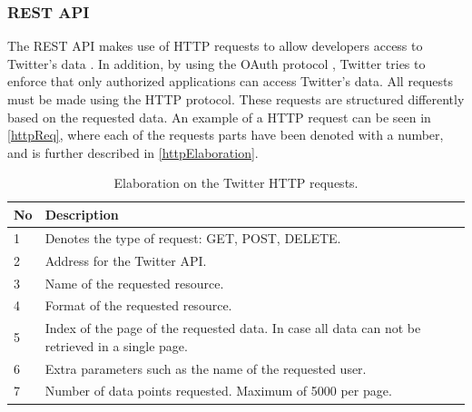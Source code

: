 \subsubsection{REST API}
The \ac{REST} \ac{API} makes use of \ac{HTTP} requests to allow developers
access to Twitter's data \citep{TwitterREST}. In addition, by using the OAuth protocol
\citep{TwitterOAuth}, Twitter tries to enforce that only authorized applications
can access Twitter's data. All requests must be made using the
\ac{HTTP} protocol. These requests are structured differently based on the
requested data. An example of a \ac{HTTP} request can be seen in
\autoref{httpReq}, where each of the requests parts have been denoted with a
number, and is further described in \autoref{httpElaboration}.


\begin{table}[H] 
\begin{centering}
\begin{tabular}{|l|p{9cm}|l|}
\hline
\textbf{No}&	\textbf{Description}										\\\hline
1			&	Denotes the type of request: GET, POST, DELETE.				\\\hline
2			&	Address for the Twitter \ac{API}.							\\\hline
3			&	Name of the requested resource.	   							\\\hline
4			&	Format of the requested resource.							\\\hline
5			&	Index of the page of the requested data. In case all data can not be
retrieved in a single page.													\\\hline 
6			&	Extra parameters such as the name of the requested user.	\\\hline
7			&	Number of data points requested. Maximum of 5000 per page.	\\\hline
\end{tabular}
\caption{Elaboration on the Twitter HTTP requests.}
\label{httpElaboration}
\end{centering}
\end{table}
